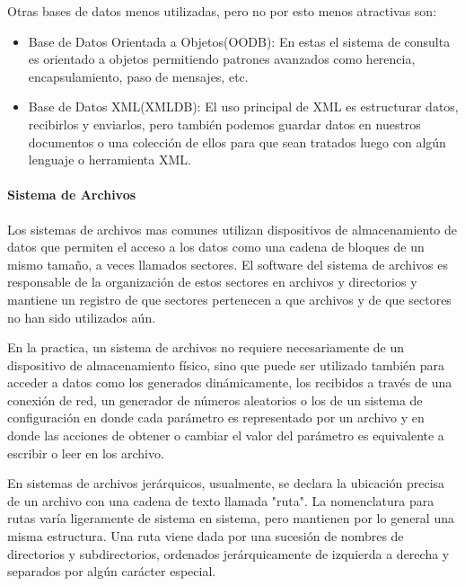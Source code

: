 Otras bases de datos menos utilizadas, pero no por esto menos atractivas son:

\begin{itemize}

	\item Base de Datos Orientada a Objetos(OODB): En estas el sistema de consulta es orientado a objetos permitiendo patrones avanzados como herencia, encapsulamiento, paso de mensajes, etc.
	
	\item Base de Datos XML(XMLDB): El uso principal de XML es estructurar datos, recibirlos y enviarlos, pero también podemos guardar datos en nuestros documentos o una colección de ellos para que sean tratados luego con algún lenguaje o herramienta XML.

\end{itemize}


\paragraph{Sistema de Archivos}

Los sistemas de archivos mas comunes utilizan dispositivos de almacenamiento de datos que permiten el acceso a los datos como una cadena de bloques de un mismo tamaño, a veces llamados sectores. El software del sistema de archivos es responsable de la organización de estos sectores en archivos y directorios y mantiene un registro de que sectores pertenecen a que archivos y de que sectores no han sido utilizados aún.

En la practica, un sistema de archivos no requiere necesariamente de un dispositivo de almacenamiento físico, sino que puede ser utilizado también para acceder a datos como los generados dinámicamente, los recibidos a través de una conexión de red, un generador de números aleatorios o los de un sistema de configuración en donde cada parámetro es representado por un archivo y en donde las acciones de obtener o cambiar el valor del parámetro es equivalente a escribir o leer en los archivo.

En sistemas de archivos jerárquicos, usualmente, se declara la ubicación precisa de un archivo con una cadena de texto llamada "ruta". La nomenclatura para rutas varía ligeramente de sistema en sistema, pero mantienen por lo general una misma estructura. Una ruta viene dada por una sucesión de nombres de directorios y subdirectorios, ordenados jerárquicamente de izquierda a derecha y separados por algún carácter especial.


